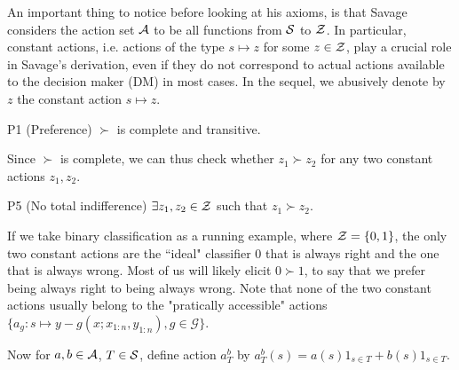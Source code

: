 An important thing to notice before looking at his axioms, is that Savage considers the action set $\mathcal{A}$ to be all functions from $\mathcal{S}$ to $\mathcal{Z}$. 
In particular, constant actions, i.e. actions of the type $s\mapsto z$ for some $z\in\mathcal{Z}$, play a crucial role in Savage's derivation, even if they do not correspond to actual actions available to the decision maker (DM) in most cases. 
In the sequel, we abusively denote by $z$ the constant action $s\mapsto z$.

\begin{axiom}{P1 (Preference)}\label{a:P1}
$\succ$ is complete and transitive.
\end{axiom}

Since $\succ$ is complete, we can thus check whether $z_1\succ z_2$ for any two constant actions $z_1,z_2$.

\begin{axiom}{P5 (No total indifference)}\label{a:P5}
$\exists z_1,z_2\in\mathcal{Z}$ such that $z_1\succ z_2$.
\end{axiom}
\begin{example}
  \label{e:binary_classification}
  If we take binary classification as a running example, where $\mathcal{Z}=\{0,1\}$, the only two constant actions are the ``ideal" classifier $0$ that is always right and the one that is always wrong.
  Most of us will likely elicit $0\succ 1$, to say that we prefer being always right to being always wrong.
  Note that none of the two constant actions usually belong to the "pratically accessible" actions $\{a_g:s \mapsto y - g(x; x_{1:n}, y_{1:n}), g\in \mathcal{G}\}$.
\end{example}

Now for $a,b\in\mathcal{A}$, $T\in\mathcal{S}$, define action $a_{T}^b$ by $a_{T}^b(s) = a(s)1_{s\in T} + b(s)1_{s\in T}$.

